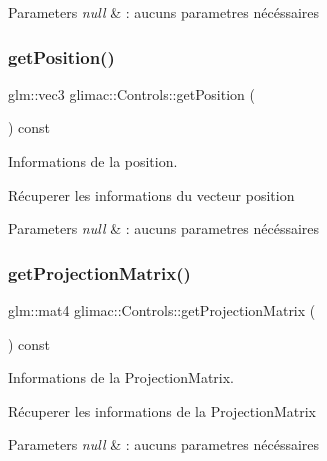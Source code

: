 \begin{DoxyParams}{Parameters}
{\em null} & \+: aucuns parametres nécéssaires \\
\hline
\end{DoxyParams}
\mbox{\label{classglimac_1_1Controls_ae6aed7f92564adca551265a404478289}} 
\subsubsection{\texorpdfstring{get\+Position()}{getPosition()}}
{\footnotesize\ttfamily glm\+::vec3 glimac\+::\+Controls\+::get\+Position (\begin{DoxyParamCaption}{ }\end{DoxyParamCaption}) const}



Informations de la position. 

Récuperer les informations du vecteur position


\begin{DoxyParams}{Parameters}
{\em null} & \+: aucuns parametres nécéssaires \\
\hline
\end{DoxyParams}
\mbox{\label{classglimac_1_1Controls_a4d2d27f8aee288bac128e2965c184e3d}} 
\subsubsection{\texorpdfstring{get\+Projection\+Matrix()}{getProjectionMatrix()}}
{\footnotesize\ttfamily glm\+::mat4 glimac\+::\+Controls\+::get\+Projection\+Matrix (\begin{DoxyParamCaption}{ }\end{DoxyParamCaption}) const}



Informations de la Projection\+Matrix. 

Récuperer les informations de la Projection\+Matrix


\begin{DoxyParams}{Parameters}
{\em null} & \+: aucuns parametres nécéssaires \\
\hline
\end{DoxyParams}
\mbox{\label{classglimac_1_1Controls_ab14c0edc3850dcefe38bdd4e6cfd4188}} 
